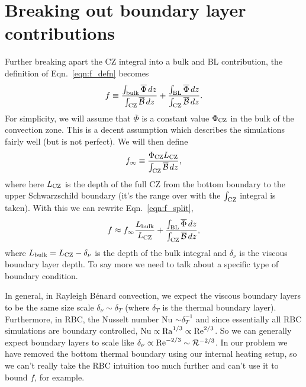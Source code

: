 \documentclass[12pt]{article}
\renewcommand{\bar}[1]{\overline{#1}}
\newcommand{\mB}{\ensuremath{\mathcal{B}}}
\begin{document}
\section{Breaking out boundary layer contributions}
Further breaking apart the CZ integral into a bulk and BL contribution, the definition of Eqn.~\ref{eqn:f_defn} becomes
\begin{equation}
f \equiv 
\frac{\int_{\rm{bulk}}\bar{\Phi}\,dz}{\int_{\rm{CZ}}\bar{\mB}\,dz}
+
\frac{\int_{\rm{BL}}\bar{\Phi}\,dz}{\int_{\rm{CZ}}\bar{\mB}\,dz}.
\label{eqn:f_split}
\end{equation}
For simplicity, we will assume that $\bar{\Phi}$ is a constant value $\Phi_{\rm{CZ}}$ in the bulk of the convection zone.
This is a decent assumption which describes the simulations fairly well (but is not perfect).
We will then define
\begin{equation}
f_{\infty} \equiv \frac{\Phi_{\rm{CZ}} L_{\rm{CZ}}}{\int_{\rm{CZ}}\bar{\mB}\,dz},
\end{equation}
where here $L_{\rm{CZ}}$ is the depth of the full CZ from the bottom boundary to the upper Schwarzschild boundary (it's the range over with the $\int_{\rm{CZ}}$ integral is taken).
With this we can rewrite Eqn.~\ref{eqn:f_split},
\begin{equation}
f \approx f_{\infty} \frac{L_{\rm{bulk}}}{L_{\rm{CZ}}} + 
\frac{\int_{\rm{BL}}\bar{\Phi}\,dz}{\int_{\rm{CZ}}\bar{\mB}\,dz},
\label{eqn:f_approx}
\end{equation}
where $L_{\rm{bulk}} = L_{\rm{CZ}} - \delta_{\nu}$ is the depth of the bulk integral and $\delta_{\nu}$ is the viscous boundary layer depth.
To say more we need to talk about a specific type of boundary condition.

In general, in Rayleigh B\'{e}nard convection, we expect the viscous boundary layers to be the same size scale $\delta_{\nu} \sim \delta_{T}$ (where $\delta_T$ is the thermal boundary layer).
Furthermore, in RBC, the Nusselt number Nu $\sim \delta_T^{-1}$ and since essentially all RBC simulations are boundary controlled, $\rm{Nu} \propto \rm{Ra}^{1/3} \propto \rm{Re}^{2/3}$.
So we can generally expect boundary layers to scale like $\delta_{\nu} \propto \rm{Re}^{-2/3} \sim \mathcal{R}^{-2/3}$.
In our problem we have removed the bottom thermal boundary using our internal heating setup, so we can't really take the RBC intuition too much further and can't use it to bound $f$, for example.
\end{document}
